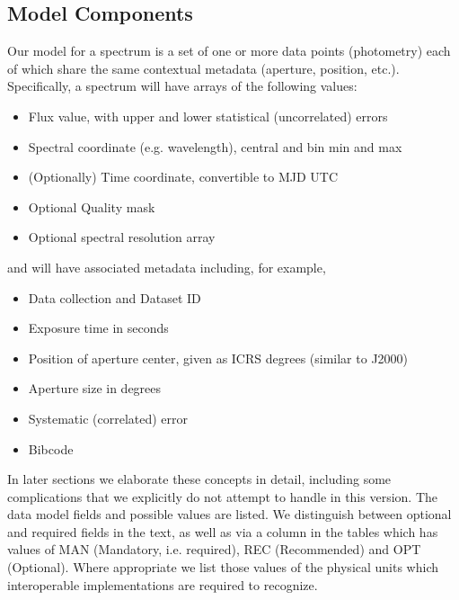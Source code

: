 \documentclass[11pt]{article}
\begin{document}
\subsection{Model Components}

Our model for a spectrum is a set of one or more data points (photometry)  each of
which share the same contextual metadata  (aperture, position,
etc.). Specifically, a spectrum
will have arrays of the following values:

\vskip 0.1in

\colorbox{ipink}{
\begin{minipage}{0.9\textwidth}

\begin{itemize}
\item Flux value, with upper and lower statistical (uncorrelated) errors 
\item Spectral coordinate  (e.g. wavelength), central and bin min and max 
\item (Optionally) Time coordinate, convertible to MJD UTC
\item Optional Quality mask
\item Optional spectral resolution array
\end{itemize}
\end{minipage}
}

\vskip 0.1in

and will have associated metadata including, for example,

\vskip 0.1in

\colorbox{ipink}{
\begin{minipage}{0.9\textwidth}
\begin{itemize}
\item Data collection and Dataset ID
\item Exposure time in seconds
\item Position of aperture center, given as ICRS degrees
(similar to J2000)
\item Aperture size in degrees
\item Systematic (correlated) error
\item Bibcode
\end{itemize}
\end{minipage}
}

\vskip 0.1in

In later sections we elaborate these concepts in detail, including some
complications that we explicitly do not attempt to handle in this
version.
The data model fields and possible values
are listed. We distinguish between optional and required fields in the
text, as well as via a 
column in the tables which has values of MAN (Mandatory, i.e. required),
REC (Recommended) and OPT (Optional).
Where appropriate we list those values of the physical units which interoperable
implementations are required to recognize.
\end{document}

